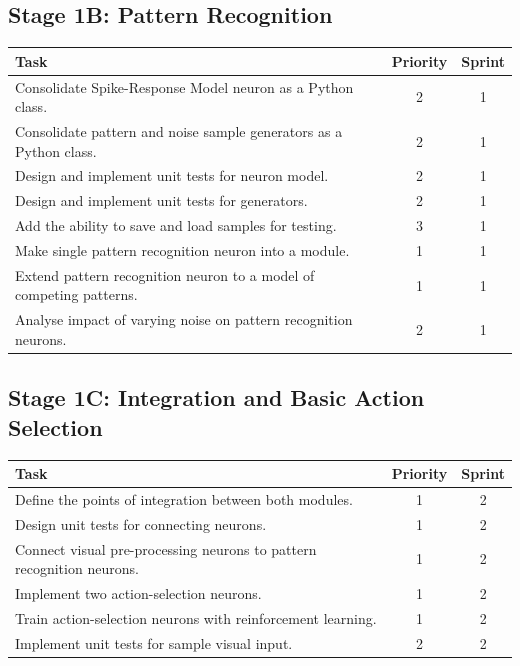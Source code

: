 \documentclass[a4paper,11pt]{article}
\begin{document}
\subsection{Stage 1B: Pattern Recognition}
\begin{center}
    \begin{tabular}{p{12cm} c c}
    \textbf{Task} & \textbf{Priority} & \textbf{Sprint} \\ \hline
	Consolidate Spike-Response Model neuron as a Python class. & 2 & 1 \\
	Consolidate pattern and noise sample generators as a Python class. & 2 & 1 \\
	Design and implement unit tests for neuron model. & 2 & 1 \\
	Design and implement unit tests for generators. & 2 & 1 \\
	Add the ability to save and load samples for testing. & 3 & 1 \\
	Make single pattern recognition neuron into a module. & 1 & 1 \\
	Extend pattern recognition neuron to a model of competing patterns. & 1 & 1 \\
	Analyse impact of varying noise on pattern recognition neurons. & 2 & 1 \\
    \end{tabular}
\end{center}

\subsection{Stage 1C: Integration and Basic Action Selection}
\begin{center}
    \begin{tabular}{p{12cm} c c}
    \textbf{Task} & \textbf{Priority} & \textbf{Sprint} \\ \hline
	Define the points of integration between both modules. & 1 & 2 \\
	Design unit tests for connecting neurons. & 1 & 2 \\    
	Connect visual pre-processing neurons to pattern recognition neurons. & 1 & 2 \\
	Implement two action-selection neurons. & 1 & 2\\
	Train action-selection neurons with reinforcement learning. & 1 & 2\\    
	Implement unit tests for sample visual input. & 2 & 2 \\
    \end{tabular}
\end{center}
\end{document}
